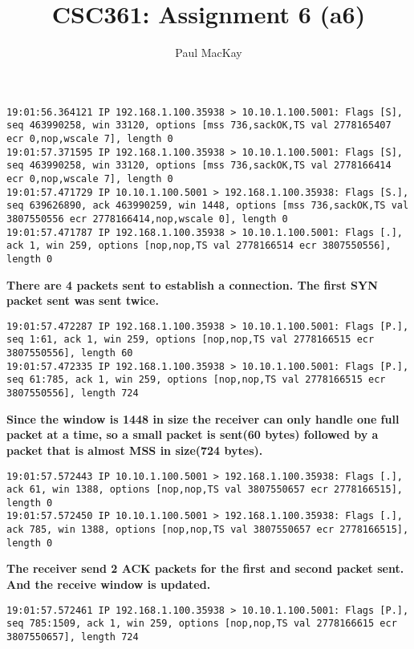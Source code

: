 \documentclass{article}
\title{CSC361: Assignment 6 (a6)}
\author{Paul MacKay}
\begin{document}
\maketitle

\section{}
{\small
\begin{lstlisting}
19:01:56.364121 IP 192.168.1.100.35938 > 10.10.1.100.5001: Flags [S], seq 463990258, win 33120, options [mss 736,sackOK,TS val 2778165407 ecr 0,nop,wscale 7], length 0
19:01:57.371595 IP 192.168.1.100.35938 > 10.10.1.100.5001: Flags [S], seq 463990258, win 33120, options [mss 736,sackOK,TS val 2778166414 ecr 0,nop,wscale 7], length 0
19:01:57.471729 IP 10.10.1.100.5001 > 192.168.1.100.35938: Flags [S.], seq 639626890, ack 463990259, win 1448, options [mss 736,sackOK,TS val 3807550556 ecr 2778166414,nop,wscale 0], length 0
19:01:57.471787 IP 192.168.1.100.35938 > 10.10.1.100.5001: Flags [.], ack 1, win 259, options [nop,nop,TS val 2778166514 ecr 3807550556], length 0
\end{lstlisting}
    \textbf{There are 4 packets sent to establish a connection. The first SYN packet sent was sent twice.}
\begin{lstlisting}
19:01:57.472287 IP 192.168.1.100.35938 > 10.10.1.100.5001: Flags [P.], seq 1:61, ack 1, win 259, options [nop,nop,TS val 2778166515 ecr 3807550556], length 60
19:01:57.472335 IP 192.168.1.100.35938 > 10.10.1.100.5001: Flags [P.], seq 61:785, ack 1, win 259, options [nop,nop,TS val 2778166515 ecr 3807550556], length 724
\end{lstlisting}
    \textbf{Since the window is 1448 in size the receiver can only handle one full packet at a time, so a small packet is sent(60 bytes) followed by a packet that is almost MSS in size(724 bytes).} 
\begin{lstlisting}
19:01:57.572443 IP 10.10.1.100.5001 > 192.168.1.100.35938: Flags [.], ack 61, win 1388, options [nop,nop,TS val 3807550657 ecr 2778166515], length 0
19:01:57.572450 IP 10.10.1.100.5001 > 192.168.1.100.35938: Flags [.], ack 785, win 1388, options [nop,nop,TS val 3807550657 ecr 2778166515], length 0
\end{lstlisting}
    \textbf{The receiver send 2 ACK packets for the first and second packet sent. And the receive window is updated.}
\begin{lstlisting}
19:01:57.572461 IP 192.168.1.100.35938 > 10.10.1.100.5001: Flags [P.], seq 785:1509, ack 1, win 259, options [nop,nop,TS val 2778166615 ecr 3807550657], length 724

\end{lstlisting}}
\end{document}
